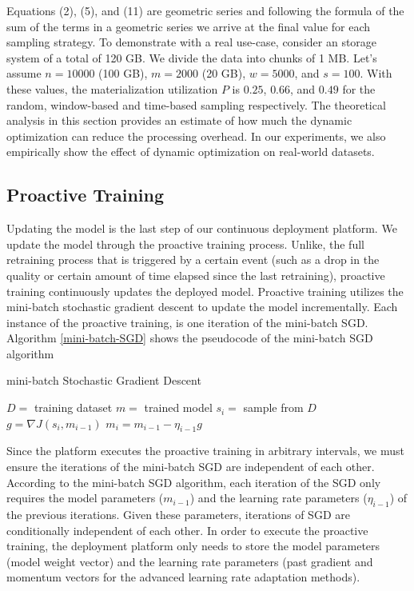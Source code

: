 Equations (2), (5), and (11) are geometric series and following the formula of the sum of the terms in a geometric series we arrive at the final value for each sampling strategy.
To demonstrate with a real use-case, consider an storage system of a total of 120 GB.
We divide the data into chunks of 1 MB. 
Let's assume $n=10000$ (100 GB), $m=2000$ (20 GB), $w=5000$, and $s=100$.
With these values, the materialization utilization $P$ is $0.25$, $0.66$, and $0.49$ for the random, window-based and time-based sampling respectively.
The theoretical analysis in this section provides an estimate of how much the dynamic optimization can reduce the processing overhead.
In our experiments, we also empirically show the effect of dynamic optimization on real-world datasets.

\subsection{Proactive Training}\label{proactive-training}
Updating the model is the last step of our continuous deployment platform.
We update the model through the proactive training process.
Unlike, the full retraining process that is triggered by a certain event (such as a drop in the quality or certain amount of time elapsed since the last retraining), proactive training continuously updates the deployed model.
Proactive training utilizes the mini-batch stochastic gradient descent to update the model incrementally.
Each instance of the proactive training, is one iteration of the mini-batch SGD.
Algorithm \ref{mini-batch-SGD} shows the pseudocode of the mini-batch SGD algorithm
\begin{algorithm}
\caption{mini-batch Stochastic Gradient Descent}\label{mini-batch-SGD}
\begin{algorithmic}[1]
\Require  $D=$ training dataset
\Ensure $m=$ trained model
	\State $s_i =$ sample from $D$
	\State $g = \nabla J(s_i, m_{i-1})$
	\State $m_i = m_{i-1} - \eta_{i-1}g$
\EndFor
\end{algorithmic}
\end{algorithm}

Since the platform executes the proactive training in arbitrary intervals, we must ensure the iterations of the mini-batch SGD are independent of each other.
According to the mini-batch SGD algorithm, each iteration of the SGD only requires the model parameters ($m_{i-1}$) and the learning rate parameters ($\eta_{i-1}$) of the previous iterations.
Given these parameters, iterations of SGD are conditionally independent of each other.
In order to execute the proactive training, the deployment platform only needs to store the model parameters (model weight vector) and the learning rate parameters (past gradient and momentum vectors for the advanced learning rate adaptation methods).

